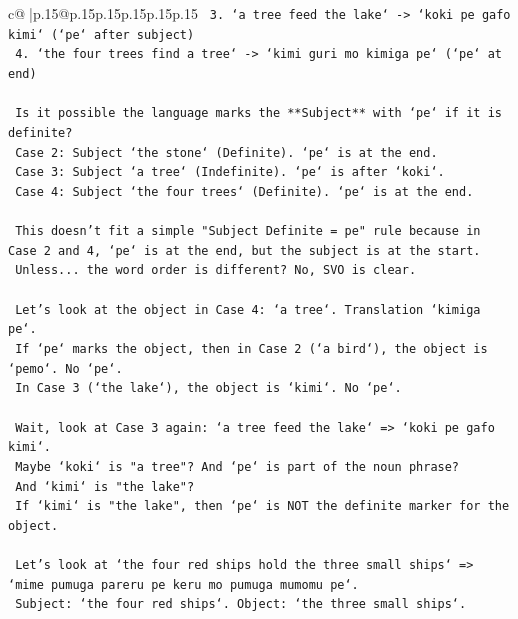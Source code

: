 \documentclass{article}
\begin{document}
{\begin{supertabular}{c@{$\;$}|p{.15\linewidth}@{}p{.15\linewidth}p{.15\linewidth}p{.15\linewidth}p{.15\linewidth}p{.15\linewidth}}
{{{\texttt{                    3. `a tree feed the lake` {-}> `koki pe gafo kimi` (`pe` after subject)} \\
\texttt{                    4. `the four trees find a tree` {-}> `kimi guri mo kimiga pe` (`pe` at end)} \\
\\ 
\texttt{                    Is it possible the language marks the **Subject** with `pe` if it is definite?} \\
\texttt{                    Case 2: Subject `the stone` (Definite). `pe` is at the end.} \\
\texttt{                    Case 3: Subject `a tree` (Indefinite). `pe` is after `koki`.} \\
\texttt{                    Case 4: Subject `the four trees` (Definite). `pe` is at the end.} \\
\\ 
\texttt{                    This doesn't fit a simple "Subject Definite = pe" rule because in Case 2 and 4, `pe` is at the end, but the subject is at the start.} \\
\texttt{                    Unless... the word order is different? No, SVO is clear.} \\
\\ 
\texttt{                    Let's look at the object in Case 4: `a tree`. Translation `kimiga pe`.} \\
\texttt{                    If `pe` marks the object, then in Case 2 (`a bird`), the object is `pemo`. No `pe`.} \\
\texttt{                    In Case 3 (`the lake`), the object is `kimi`. No `pe`.} \\
\\ 
\texttt{                    Wait, look at Case 3 again: `a tree feed the lake` => `koki pe gafo kimi`.} \\
\texttt{                    Maybe `koki` is "a tree"? And `pe` is part of the noun phrase?} \\
\texttt{                    And `kimi` is "the lake"?} \\
\texttt{                    If `kimi` is "the lake", then `pe` is NOT the definite marker for the object.} \\
\\ 
\texttt{                    Let's look at `the four red ships hold the three small ships` => `mime pumuga pareru pe keru mo pumuga mumomu pe`.} \\
\texttt{                    Subject: `the four red ships`. Object: `the three small ships`.} \\
}}}
\end{supertabular}}
\end{document}
